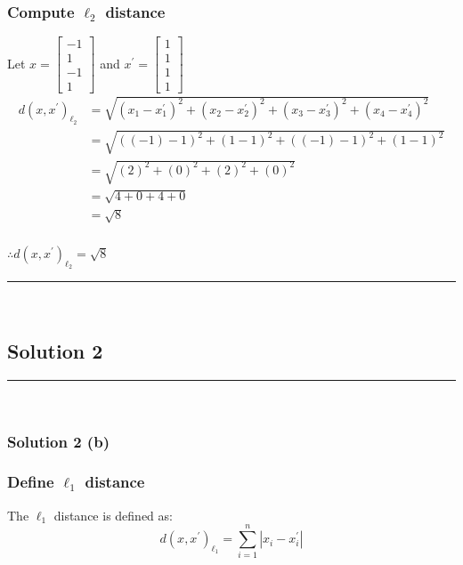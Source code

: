\documentclass{article}
\begin{document}
\subsubsection*{Compute $\ell_{2}$ distance}
\parbox{\textwidth}{
Let $x = \begin{bmatrix} -1 \\ 1 \\ -1 \\ 1 \end{bmatrix}$ and $x^{\prime}=\begin{bmatrix} 1 \\ 1 \\ 1 \\ 1 \end{bmatrix}$
\begin{align*}
    d(x, x^{\prime})_{\ell_2} &= \sqrt{(x_{1}-x_{1}^{\prime})^2 + (x_{2}-x_{2}^{\prime})^2 + (x_{3}-x_{3}^{\prime})^2 + (x_{4}-x_{4}^{\prime})^2} \\
    &= \sqrt{((-1)-1)^2 + (1-1)^2 + ((-1)- 1)^2 + (1-1)^2} \\
    &= \sqrt{(2)^2 + (0)^2 + (2)^2 + (0)^2} \\
            &= \sqrt{4 + 0 + 4 + 0} \\
            &= \sqrt{8} 
\end{align*}
}
\subsubsection*{\normalfont}{$\therefore d(x, x^{\prime})_{\ell_2} = \sqrt{8}$}

\noindent\rule{\textwidth}{0.4pt}\\
\newpage

\subsection*{Solution 2}
\noindent\rule{\textwidth}{0.4pt}\\
\subsubsection*{Solution 2 (b)}

\subsubsection*{Define $\ell_{1}$ distance}
\parbox{\textwidth}{The $\ell_1$ distance is defined as:
$$d(x, x^{\prime})_{\ell_1} = \sum_{i=1}^{n} |x_i - x_{i}^{\prime}|$$
}
\end{document}
